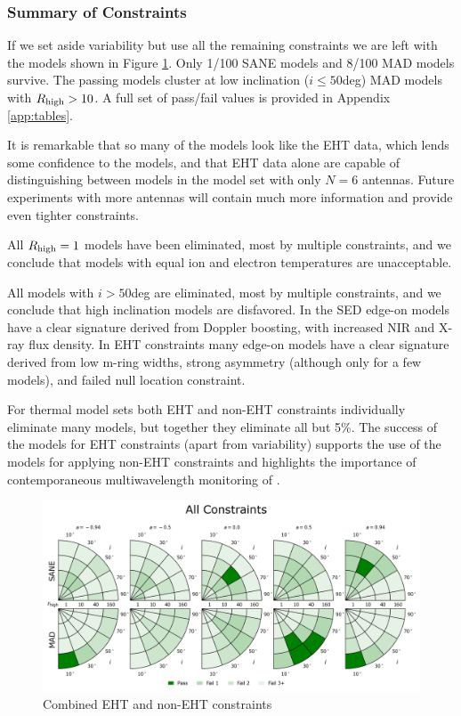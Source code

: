 
\subsubsection{Summary of Constraints}

If we set aside variability but use all the remaining constraints we are left with the models shown in Figure \ref{fig:all_cuts}.  Only 1/100 SANE models and 8/100 MAD models survive. The passing models cluster at low inclination ($i \le 50$deg) MAD models with $R_\mathrm{high} > 10$.  A full set of pass/fail values is provided in Appendix \ref{app:tables}.

It is remarkable that so many of the models look like the EHT data, which lends some  confidence to the models, and that EHT data alone are capable of distinguishing between models in the model set with only $N = 6$ antennas.  Future experiments with more antennas will contain much more information and provide even tighter constraints.

All $R_\mathrm{high} = 1$ models have been eliminated, most by multiple constraints, and we conclude that models with equal ion and electron temperatures are unacceptable.

All models with $i > 50$deg are eliminated, most by multiple constraints, and we conclude that high inclination models are disfavored.  In the SED edge-on models have a clear signature derived from Doppler boosting, with increased NIR and X-ray flux density.  In EHT constraints many edge-on models have a clear signature derived from low m-ring widths, strong asymmetry (although only for a few models), and failed null location constraint.

For thermal model sets both EHT and non-EHT constraints individually eliminate many models, but together they eliminate all but 5\%.  The success of the models for EHT constraints (apart from variability) supports the use of the models for applying non-EHT constraints and highlights the importance of contemporaneous multiwavelength monitoring of \sgra.

\begin{figure}
  \centering
  \includegraphics[width=\columnwidth]{./figures/All_Constraints.png}
  \caption{Combined EHT and non-EHT constraints}
  \label{fig:all_cuts}
\end{figure}

